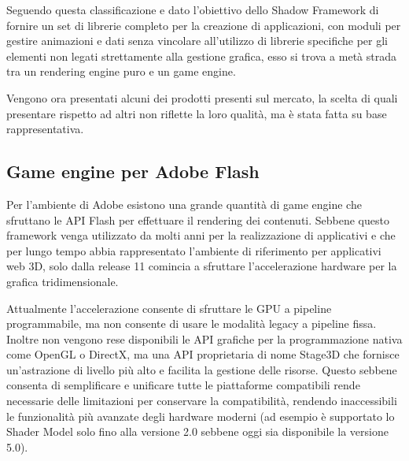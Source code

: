Seguendo questa classificazione e dato l'obiettivo dello Shadow Framework di fornire un set di librerie completo per la creazione di applicazioni, con moduli per gestire animazioni e dati senza vincolare all'utilizzo di librerie specifiche per gli elementi non legati strettamente alla gestione grafica, esso si trova a met\`a strada tra un rendering engine puro e un game engine.

Vengono ora presentati alcuni dei prodotti presenti sul mercato, la scelta di quali presentare rispetto ad altri non riflette la loro qualit\`a, ma \`e stata fatta su base rappresentativa.

\subsection{Game engine per Adobe Flash}
Per l'ambiente di Adobe esistono una grande quantit\`a di game engine che sfruttano le \ac{API} Flash per effettuare il rendering dei contenuti. Sebbene questo framework venga utilizzato da molti anni per la realizzazione di applicativi e che per lungo tempo abbia rappresentato l'ambiente di riferimento per applicativi web 3D, solo dalla release 11 comincia a sfruttare l'accelerazione hardware per la grafica tridimensionale.

Attualmente l'accelerazione consente di sfruttare le GPU a pipeline programmabile, ma non consente di usare le modalit\`a legacy a pipeline fissa. 
Inoltre non vengono rese disponibili le \ac{API} grafiche per la programmazione nativa come OpenGL o DirectX, ma una \ac{API} proprietaria di nome Stage3D che fornisce un'astrazione di livello pi\`u alto e facilita la gestione delle risorse.
Questo sebbene consenta di semplificare e unificare tutte le piattaforme compatibili rende necessarie delle limitazioni per conservare la compatibilit\`a, rendendo inaccessibili le funzionalit\`a pi\`u avanzate degli hardware moderni (ad esempio \`e supportato lo Shader Model solo fino alla versione 2.0 sebbene oggi sia disponibile la versione 5.0)\cite{site:adobestage3d}.

